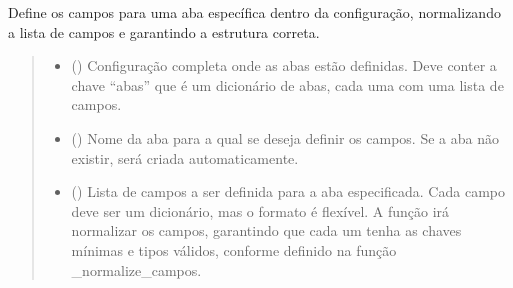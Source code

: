 \documentclass[letterpaper,10pt,english]{sphinxmanual}
\begin{document}
\begin{fulllineitems}
\label{\detokenize{api/config:config.set_sheet_campos}}
\pysigstartsignatures
\pysiglinewithargsret
{}
{\sphinxparamcomma {}\sphinxparamcomma {}}
{}
\pysigstopsignatures
\sphinxAtStartPar
Define os campos para uma aba específica dentro da configuração, normalizando a lista de campos e garantindo a estrutura correta.
\begin{quote}\begin{description}
\begin{itemize}
\item {} 
\sphinxAtStartPar
{} () \textendash{} Configuração completa onde as abas estão definidas. Deve conter a chave “abas” que é um dicionário de abas, cada uma com uma lista de campos.

\item {} 
\sphinxAtStartPar
{} () \textendash{} Nome da aba para a qual se deseja definir os campos. Se a aba não existir, será criada automaticamente.

\item {} 
\sphinxAtStartPar
{} () \textendash{} Lista de campos a ser definida para a aba especificada. Cada campo deve ser um dicionário, mas o formato é flexível. A função irá normalizar os campos, garantindo que cada um tenha as chaves mínimas e tipos válidos, conforme definido na função \_normalize\_campos.

\end{itemize}

\sphinxAtStartPar
{}

\end{description}\end{quote}

\end{fulllineitems}

\end{document}
